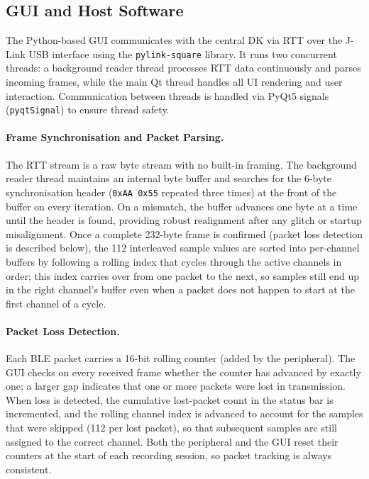 
\subsection{GUI and Host Software}
\label{sec:gui}

The Python-based GUI communicates with the central DK via RTT over the J-Link
USB interface using the \texttt{pylink-square} library. It runs two concurrent
threads: a background reader thread processes RTT data continuously and parses
incoming frames, while the main Qt thread handles all UI rendering and user
interaction. Communication between threads is handled via PyQt5 signals
(\texttt{pyqtSignal}) to ensure thread safety.

\paragraph{Frame Synchronisation and Packet Parsing.}
The RTT stream is a raw byte stream with no built-in framing. The background
reader thread maintains an internal byte buffer and searches for the 6-byte synchronisation
header (\texttt{0xAA 0x55} repeated three times) at the front of the buffer on
every iteration. On a mismatch, the buffer advances one byte at a time until the
header is found, providing robust realignment after any glitch or startup
misalignment. Once a complete 232-byte frame is confirmed (packet loss detection
is described below), the 112 interleaved sample values are sorted into
per-channel buffers by following a rolling index that cycles through the active
channels in order; this index carries over from one packet to the next, so
samples still end up in the right channel's buffer even when a packet does not
happen to start at the first channel of a cycle.

\paragraph{Packet Loss Detection.}
Each BLE packet carries a 16-bit rolling counter (added by the peripheral). The
GUI checks on every received frame whether the counter has advanced by exactly
one; a larger gap indicates that one or more packets were lost in transmission.
When loss is detected, the cumulative lost-packet count in the status bar is
incremented, and the rolling channel index is advanced to account for the samples
that were skipped (112 per lost packet), so that subsequent samples are still
assigned to the correct channel. Both the peripheral and the GUI reset their
counters at the start of each recording session, so packet tracking is always
consistent.

